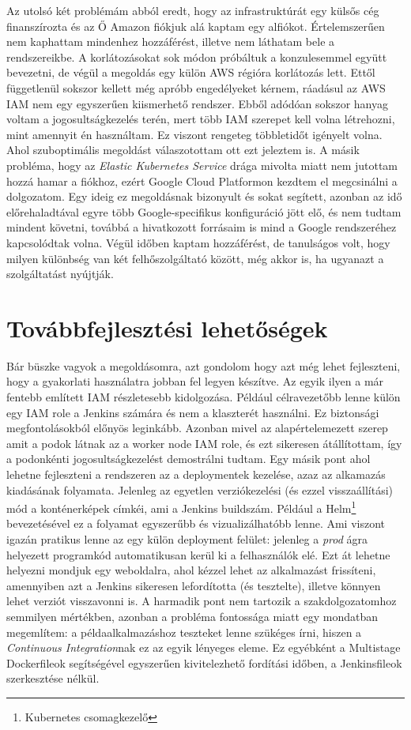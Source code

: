 Az utolsó két problémám abból eredt, hogy az infrastruktúrát egy külsős cég finanszírozta és az Ő Amazon fiókjuk alá kaptam egy alfiókot. Értelemszerűen nem kaphattam mindenhez hozzáférést, illetve nem láthatam bele a rendszereikbe. A korlátozásokat sok módon próbáltuk a konzulesemmel együtt bevezetni, de végül a megoldás egy külön AWS régióra korlátozás lett. Ettől függetlenül sokszor kellett még apróbb engedélyeket kérnem, ráadásul az AWS IAM nem egy egyszerűen kiismerhető rendszer. Ebből adódóan sokszor hanyag voltam a jogosultságkezelés terén, mert több IAM szerepet kell volna létrehozni, mint amennyit én használtam. Ez viszont rengeteg többletidőt igényelt volna. Ahol szuboptimális megoldást válaszotottam ott ezt jeleztem is. A másik probléma, hogy az \textit{Elastic Kubernetes Service} drága mivolta miatt nem jutottam hozzá hamar a fiókhoz, ezért Google Cloud Platformon kezdtem el megcsinálni a dolgozatom. Egy ideig ez megoldásnak bizonyult és sokat segített, azonban az idő előrehaladtával egyre több Google-specifikus konfiguráció jött elő, és nem tudtam mindent követni, továbbá a hivatkozott forrásaim is mind a Google rendszeréhez kapcsolódtak volna. Végül időben kaptam hozzáférést, de tanulságos volt, hogy milyen különbség van két felhőszolgáltató között, még akkor is, ha ugyanazt a szolgáltatást nyújtják.
\section{Továbbfejlesztési lehetőségek}
Bár büszke vagyok a megoldásomra, azt gondolom hogy azt még lehet fejleszteni, hogy a gyakorlati használatra jobban fel legyen készítve. Az egyik ilyen a már fentebb említett IAM részletesebb kidolgozása. Például célravezetőbb lenne külön egy IAM role a Jenkins számára és nem a klaszterét használni. Ez biztonsági megfontolásokból előnyös leginkább. Azonban mivel az alapértelemezett szerep amit a podok látnak az a worker node IAM role, és ezt sikeresen átállítottam, így a podonkénti jogosultságkezelést demostrálni tudtam.
Egy másik pont ahol lehetne fejleszteni a rendszeren az a deploymentek kezelése, azaz az alkamazás kiadásának folyamata. Jelenleg az egyetlen verziókezelési (és ezzel visszaállítási) mód a konténerképek címkéi, ami a Jenkins buildszám. Például a Helm\footnote{Kubernetes csomagkezelő} bevezetésével ez a folyamat egyszerűbb és vizualizálhatóbb lenne. Ami viszont igazán pratikus lenne az egy külön deployment felület: jelenleg a \textit{prod} ágra helyezett programkód automatikusan kerül ki a felhasználók elé. Ezt át lehetne helyezni mondjuk egy weboldalra, ahol kézzel lehet az alkalmazást frissíteni, amennyiben azt a Jenkins sikeresen lefordította (és tesztelte), illetve könnyen lehet verziót visszavonni is.
A harmadik pont nem tartozik a szakdolgozatomhoz semmilyen mértékben, azonban a probléma fontossága miatt egy mondatban megemlítem: a példaalkalmazáshoz teszteket lenne szükéges írni, hiszen a \textit{Continuous Integration}nak ez az egyik lényeges eleme. Ez egyébként a Multistage Dockerfileok segítségével egyszerűen kivitelezhető fordítási időben, a Jenkinsfileok szerkesztése nélkül.